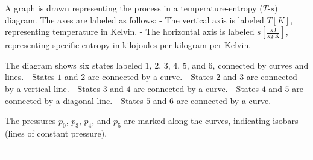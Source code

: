 A graph is drawn representing the process in a temperature-entropy (\( T \)-\( s \)) diagram. The axes are labeled as follows:  
- The vertical axis is labeled \( T [K] \), representing temperature in Kelvin.  
- The horizontal axis is labeled \( s [\frac{\text{kJ}}{\text{kg·K}}] \), representing specific entropy in kilojoules per kilogram per Kelvin.  

The diagram shows six states labeled \( 1 \), \( 2 \), \( 3 \), \( 4 \), \( 5 \), and \( 6 \), connected by curves and lines.  
- States \( 1 \) and \( 2 \) are connected by a curve.  
- States \( 2 \) and \( 3 \) are connected by a vertical line.  
- States \( 3 \) and \( 4 \) are connected by a curve.  
- States \( 4 \) and \( 5 \) are connected by a diagonal line.  
- States \( 5 \) and \( 6 \) are connected by a curve.  

The pressures \( p_0 \), \( p_3 \), \( p_4 \), and \( p_5 \) are marked along the curves, indicating isobars (lines of constant pressure).  

---